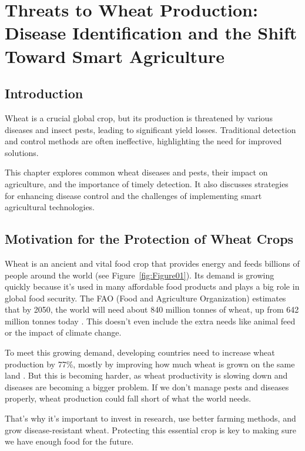 \chapter{Threats to Wheat Production: Disease Identification and the Shift Toward Smart Agriculture}

\section{Introduction}

Wheat is a crucial global crop, but its production is threatened by various diseases and insect pests, leading to significant yield losses. Traditional detection and control methods are often ineffective, highlighting the need for improved solutions. 

This chapter explores common wheat diseases and pests, their impact on agriculture, and the importance of timely detection. It also discusses strategies for enhancing disease control and the challenges of implementing smart agricultural technologies.



\section{Motivation for the Protection of Wheat Crops}

Wheat is an ancient and vital food crop that provides energy and feeds billions of people around the world (see Figure~\ref{fig:Figure01}). Its demand is growing quickly because it’s used in many affordable food products and plays a big role in global food security. The FAO (Food and Agriculture Organization) estimates that by 2050, the world will need about 840 million tonnes of wheat, up from 642 million tonnes today \parencite{sharma2015wheat}. This doesn’t even include the extra needs like animal feed or the impact of climate change.

To meet this growing demand, developing countries need to increase wheat production by 77\%, mostly by improving how much wheat is grown on the same land \parencite{sharma2015wheat}. But this is becoming harder, as wheat productivity is slowing down and diseases are becoming a bigger problem. If we don’t manage pests and diseases properly, wheat production could fall short of what the world needs.

That’s why it's important to invest in research, use better farming methods, and grow disease-resistant wheat. Protecting this essential crop is key to making sure we have enough food for the future.


